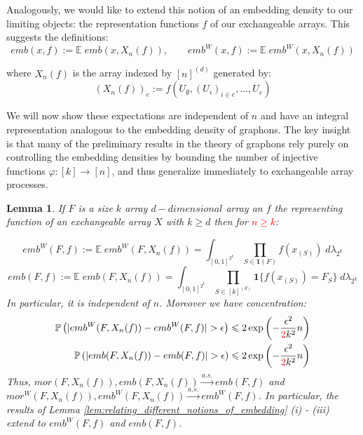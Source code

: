 \documentclass[11pt,oneside,reqno]{article}
\theoremstyle{plain}
\newtheorem{lemma}[theorem]{Lemma}
\theoremstyle{definition}
\numberwithin{equation}{section}
\renewcommand{\leq}{\leqslant}
\renewcommand{\geq}{\geqslant}
\renewcommand{\phi}{\varphi}
\newcommand{\E}{\mathbb{E}}
\renewcommand{\P}{\mathbb{P}}
\newcommand{\red}{\textcolor{red}}
\newcommand{\ind}{\mathbf{1}}
\begin{document}
Analogously, we would like to extend this notion of an embedding density to our limiting objects: the representation functions $f$ of our exchangeable arrays. This suggests the definitions:
%
\begin{equation}
    emb(x, f) := \E \; emb(x, X_n(f)), \qquad  emb^W(x, f) := \E \; emb^W(x, X_n(f)) 
\end{equation}

\noindent where $X_n(f)$ is the array indexed by $[n]^{(d)}$ generated by:
%
\[(X_n(f))_e := f(U_\emptyset, (U_i)_{i \in e},..., U_e)\]

\noindent We will now show these expectations are independent of $n$ and have an integral representation analogous to the embedding density of graphons. The key insight is that many of the preliminary results in the theory of graphons rely purely on controlling the embedding densities by bounding the number of injective functions $\phi:[k] \to [n]$, and thus generalize immediately to exchangeable array processes.

\begin{lemma}
If $F$ is a size $k$ array $d-dimensional$ array an $f$ the representing function of an exchangeable array $X$ with $ k \geq d$ then for \red{$n \geq k$}:

\begin{equation}
    emb^W(F,f) := \E \; emb^W(F, X_n(f)) = \int_{[0,1]^{2^k}}  \prod_{S \in \ind(F)} f(x_{(S)}) \; d\lambda_{2^k} 
    \label{eqn:integral_formula_for_embedding_density_of_representing_function}
\end{equation}
\begin{equation}
    emb(F,f) := \E \; emb(F, X_n(f)) = \int_{[0,1]^{2^k}}  \prod_{S \in [k]^{(d)}} \ind \{f(x_{(S)}) = F_S\} \; d\lambda_{2^k} 
\end{equation}
%
\noindent In particular, it is independent of $n$. Moreover we have concentration:
%
\begin{align*}
    \P\left( |emb^W(F, X_n(f)) - emb^W(F, f)| > \epsilon \right) &  \leq 2 \exp \left(-\frac{\epsilon^2}{\red{2}k^2} n \right)\\
    \P\left( |emb(F, X_n(f)) - emb(F, f)| > \epsilon \right) & \leq 2 \exp \left(-\frac{\epsilon^2    }{\red{2}k^2} n \right)
\end{align*}
%
\noindent Thus, $mor(F, X_n(f)), emb(F, X_n(f)) \xrightarrow{a.s.} emb(F,f)$ and $mor^W(F, X_n(f)), emb^W(F,X_n(f)) \xrightarrow{a.s.} emb^W(F,f)$. In particular, the results of  Lemma \ref{lem:relating_different_notions_of_embedding} (i) - (iii) extend to $emb^W(F,f)$ and $emb(F,f)$.


\label{lem:integral_representations_of_embedding_densities}
\end{lemma}
\end{document}
